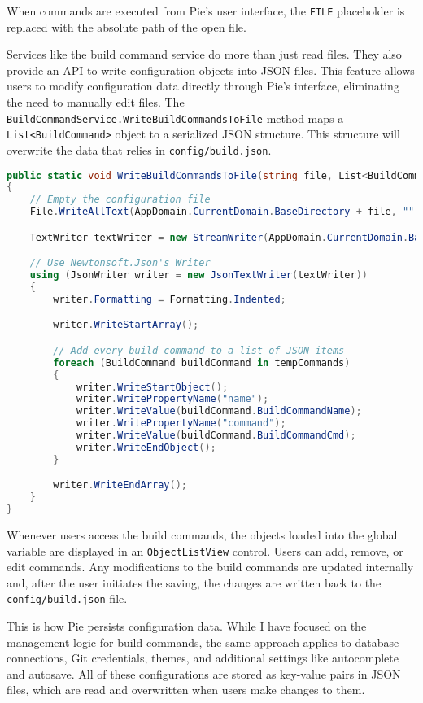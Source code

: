 When commands are executed from Pie's user interface, the \texttt{\textdollar{}FILE} placeholder is replaced with the absolute path of the open file.

Services like the build command service do more than just read files. They also provide an API to write configuration objects into JSON files. This feature allows users to modify configuration data directly through Pie's interface, eliminating the need to manually edit files. The \texttt{BuildCommandService.WriteBuildCommandsToFile} method maps a \texttt{List<BuildCommand>} object to a serialized JSON structure. This structure will overwrite the data that relies in \texttt{config/build.json}.

\begin{lstlisting}[language=csharp, caption={Serializing build command configuration data into a JSON structure}]
public static void WriteBuildCommandsToFile(string file, List<BuildCommand> tempCommands)
{
    // Empty the configuration file
    File.WriteAllText(AppDomain.CurrentDomain.BaseDirectory + file, "");

    TextWriter textWriter = new StreamWriter(AppDomain.CurrentDomain.BaseDirectory + file);

    // Use Newtonsoft.Json's Writer
    using (JsonWriter writer = new JsonTextWriter(textWriter))
    {
        writer.Formatting = Formatting.Indented;

        writer.WriteStartArray();

        // Add every build command to a list of JSON items
        foreach (BuildCommand buildCommand in tempCommands)
        {
            writer.WriteStartObject();
            writer.WritePropertyName("name");
            writer.WriteValue(buildCommand.BuildCommandName);                    
            writer.WritePropertyName("command");
            writer.WriteValue(buildCommand.BuildCommandCmd);
            writer.WriteEndObject();
        }

        writer.WriteEndArray();
    }
}
\end{lstlisting}

Whenever users access the build commands, the objects loaded into the global variable are displayed in an \texttt{ObjectListView} control. Users can add, remove, or edit commands. Any modifications to the build commands are updated internally and, after the user initiates the saving, the changes are written back to the \texttt{config/build.json} file.

This is how Pie persists configuration data. While I have focused on the management logic for build commands, the same approach applies to database connections, Git credentials, themes, and additional settings like autocomplete and autosave. All of these configurations are stored as key-value pairs in JSON files, which are read and overwritten when users make changes to them.

